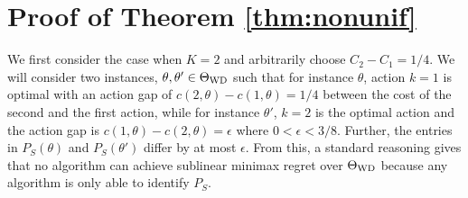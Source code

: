 \section*{Proof of Theorem \ref{thm:nonunif}}
We first consider the case when $K=2$ and arbitrarily choose $C_2 - C_1 = 1/4$. 
We will consider two instances, $\theta,\theta'\in \Theta_{\mathrm{WD}}$ such that for instance $\theta$, 
action $k=1$ is optimal with an action gap of $c(2,\theta) - c(1,\theta) = 1/4$ between the cost of the second and the first
action,  while for instance $\theta'$, $k=2$ is the optimal action and the action gap is $c(1,\theta) - c(2,\theta) = \epsilon$
where $0<\epsilon<3/8$.
Further, the entries in $P_S(\theta)$ and $P_S(\theta')$ differ by at most $\epsilon$. 
From this, a standard reasoning gives that no algorithm can achieve sublinear minimax regret over $\Theta_{\mathrm{WD}}$ because any
algorithm is only able to identify $P_S$. 

